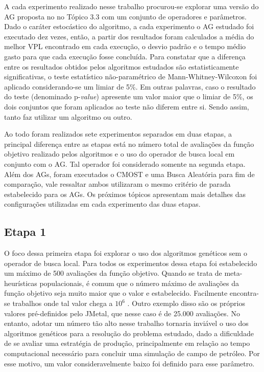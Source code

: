 A cada experimento realizado nesse trabalho procurou-se explorar uma versão do AG proposta no no Tópico 3.3 com um conjunto de operadores e parâmetros. Dado o caráter estocástico do algoritmo, a cada experimento o AG estudado foi executado dez vezes, então, a partir dos resultados foram calculados a média do melhor VPL encontrado em cada execução, o desvio padrão e o tempo médio gasto para que cada execução fosse concluída. Para constatar que a diferença entre os resultados obtidos pelos algoritmos estudados são estatisticamente significativas, o teste estatístico não-paramétrico de Mann-Whitney-Wilcoxon \cite{Corder2014} foi aplicado considerando-se um limiar de 5\%. Em outras palavras, caso o resultado do teste (denominado p-\textit{value}) apresente um valor maior que o limiar de 5\%, os dois conjuntos que foram aplicados ao teste não diferem entre si. Sendo assim, tanto faz utilizar um algoritmo ou outro. 

Ao todo foram realizados sete experimentos separados em duas etapas, a principal diferença entre as etapas está no número total de avaliações da função objetivo realizado pelos algoritmos e o uso do operador de busca local em conjunto com o AG. Tal operador foi considerado somente na segunda etapa. Além dos AGs, foram executados o CMOST e uma Busca Aleatória para fim de comparação, vale ressaltar ambos utilizaram o mesmo critério de parada estabelecido para os AGs. Os próximos tópicos apresentam mais detalhes das configurações utilizadas em cada experimento das duas etapas.

\subsection{Etapa 1}
\label{ch:4_Etapa1}
O foco dessa primeira etapa foi explorar o uso dos algoritmos genéticos sem o operador de busca local. Para todos os experimentos dessa etapa foi estabelecido um máximo de 500 avaliações da função objetivo. Quando se trata de meta-heurísticas populacionais, é comum que o número máximo de avaliações da função objetivo seja muito maior que o valor e estabelecido. Facilmente encontra-se trabalhos onde tal valor chega a $10^6$ \cite{Elsayed2016,Tangherloni2017,Kumar2017,Zamuda2017}. Outro exemplo disso são os próprios valores pré-definidos pelo JMetal, que nesse caso é de 25.000 avaliações. No entanto, adotar um número tão alto nesse trabalho tornaria inviável o uso dos algoritmos genéticos para a resolução do problema estudado, dado a dificuldade de se avaliar uma estratégia de produção, principalmente em relação ao tempo computacional necessário para concluir uma simulação de campo de petróleo. Por esse motivo, um valor consideravelmente baixo foi definido para esse parâmetro. 

